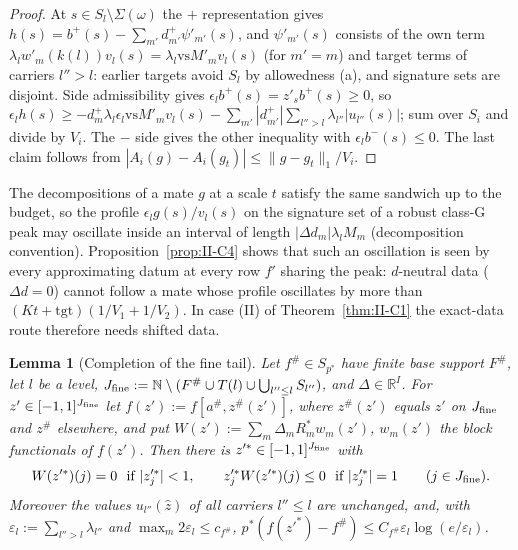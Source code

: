 \documentclass[10pt]{amsart}
\newtheorem{lemma}[theorem]{Lemma}
\theoremstyle{definition}
\theoremstyle{remark}
\newcommand{\R}{\mathbb R}
\newcommand{\N}{\mathbb N}
\newcommand{\zh}{\hat z}
\begin{document}
\begin{proof}
At $s\in S_l\setminus\Sigma(\omega)$ the $+$ representation gives $h(s)=b^+(s)-
\sum_{m'}d^+_{m'}\psi'_{m'}(s)$, and $\psi'_{m'}(s)$ consists of the own term
$\lambda_lw'_m(k(l))v_l(s)=\lambda_l\mathrm{vs}M'_mv_l(s)$ (for $m'=m$) and
target terms of carriers $l''>l$: earlier targets avoid $S_l$ by
allowedness (a), and signature sets are disjoint.  Side admissibility gives
$\epsilon_lb^+(s)=z'_sb^+(s)\ge0$, so $\epsilon_lh(s)\ge-d^+_m\lambda_l\epsilon_l
\mathrm{vs}M'_mv_l(s)-\sum_{m'}|d^+_{m'}|\sum_{l''>l}\lambda_{l''}|u_{l''}(s)|$;
sum over $S_i$ and divide by $V_i$.  The $-$ side gives the other inequality
with $\epsilon_lb^-(s)\le0$.  The last claim follows from $|A_i(g)-A_i(g_t)|\le
\|g-g_t\|_1/V_i$.
\end{proof}

The decompositions of a mate $g$ at a scale $t$ satisfy the same sandwich up
to the budget, so the profile $\epsilon_lg(s)/v_l(s)$ on the signature set of a
robust class-G peak may oscillate inside an interval of length
$|\Delta d_m|\lambda_lM_m$ (decomposition convention).
Proposition~\ref{prop:II-C4} shows that such an oscillation is seen by every
approximating datum at every row $f'$ sharing the peak: $d$-neutral data
($\Delta d=0$) cannot follow a mate whose profile oscillates by more than
$(Kt+\mathrm{tgt})(1/V_1+1/V_2)$.  In case (II) of Theorem~\ref{thm:II-C1}
the exact-data route therefore needs shifted data.

\begin{lemma}[Completion of the fine tail]\label{lem:II-C5}
Let $f^\#\in S_{p^*}$ have finite base support $F^\#$, let $l$ be a level,
$J_{\rm fine}:=\N\setminus(F^\#\cup T(l)\cup\bigcup_{l''\le l}S_{l''})$, and
$\Delta\in\R^I$.  For $z'\in[-1,1]^{J_{\rm fine}}$ let $f(z'):=f[a^\#,z^\#(z')]$,
where $z^\#(z')$ equals $z'$ on $J_{\rm fine}$ and $z^\#$ elsewhere, and put
$W(z'):=\sum_m\Delta_mR_m^*w_m(z')$, $w_m(z')$ the block functionals of $f(z')$.
Then there is $z'^*\in[-1,1]^{J_{\rm fine}}$ with
\[
 W(z'^*)(j)=0\ \text{ if }|z'^*_j|<1,\qquad z'^*_jW(z'^*)(j)\le0\ \text{ if }
 |z'^*_j|=1\qquad(j\in J_{\rm fine}).
\]
Moreover the values $u_{l''}(\zh)$ of all carriers $l''\le l$ are unchanged,
and, with $\varepsilon_l:=\sum_{l''>l}\lambda_{l''}$ and
$\max_m2\varepsilon_l\le c_{f^\#}$, $p^*(f(z'^*)-f^\#)\le C_{f^\#}\varepsilon_l
\log(e/\varepsilon_l)$.
\end{lemma}
\end{document}
